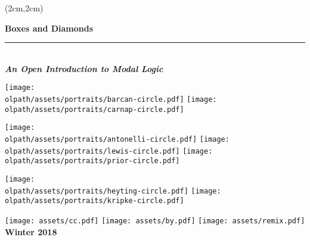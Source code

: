
\thispagestyle{empty}

\pagecolor{ltleadbeater}
  \begin{textblock*}{14cm}(2cm,2cm)%
    \begin{raggedright}
      \fontsize{32pt}{12pt}\selectfont\bfseries\sffamily%
      Boxes and Diamonds\\
      \rule{14cm}{5pt}\\[5pt]
      \normalfont\fontsize{18pt}{0pt}\selectfont\bfseries\itshape%
      An Open Introduction to Modal Logic
    \end{raggedright}

\vskip1cm

\noindent\hfill\texttt{[image: \\olpath/assets/portraits/barcan-circle.pdf]}
\texttt{[image: \\olpath/assets/portraits/carnap-circle.pdf]}\hfill{}

\noindent\texttt{[image: \\olpath/assets/portraits/antonelli-circle.pdf]}\hfill
\texttt{[image: \\olpath/assets/portraits/lewis-circle.pdf]}\hfill
\texttt{[image: \\olpath/assets/portraits/prior-circle.pdf]}

\noindent\hfill\texttt{[image: \\olpath/assets/portraits/heyting-circle.pdf]}
\texttt{[image: \\olpath/assets/portraits/kripke-circle.pdf]}\hfill{}

\vskip1cm

\noindent
\texttt{[image: assets/cc.pdf]}
\texttt{[image: assets/by.pdf]}
\texttt{[image: assets/remix.pdf]}
\normalfont\fontsize{16pt}{0pt}\selectfont\bfseries\sffamily%
\hfill Winter 2018
\end{textblock*}
\

\clearpage
\setcounter{page}{1}
\nopagecolor


